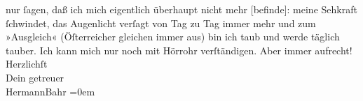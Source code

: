 \begin{ledgroupsized}[t]{13cm}
               nur ſagen, daß ich mich eigentlich überhaupt nicht {\pb}mehr {[}befinde{]}: meine Sehkraft ſchwindet, das Augenlicht verſagt
               von Tag zu Tag immer mehr und zum »Ausgleich« (Öſterreicher gleichen immer aus) bin ich taub und werde täglich tauber. Ich
               kann mich nur noch mit Hörrohr verſtändigen.\pend
           \pstart
           Aber immer aufrecht!{\\[\baselineskip]}Herzlichſt{\\[\baselineskip]}Dein getreuer{\\[\baselineskip]}\spacefill\mbox{HermannBahr}\pend
           \leftskip=0em{}          \endnumbering{}\end{ledgroupsized}  \newcommand{\dateiname}{L02547}\newcommand{\titel}{Hermann Bahr an Arthur Schnitzler, 7. 9. 1931}\newcommand{\editorInnen}{ Kurt Ifkovits,  Martin Anton Müller}
      